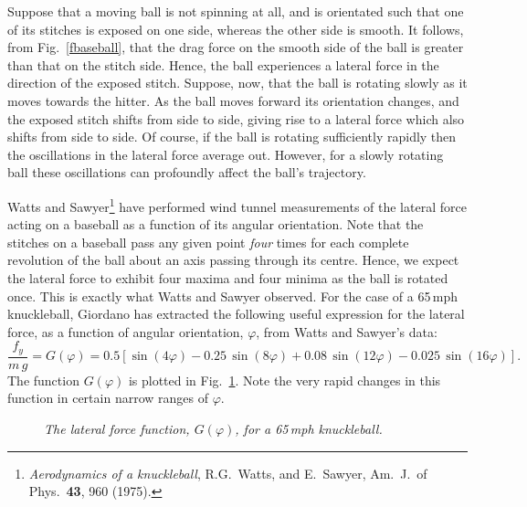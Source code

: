 Suppose that a moving ball is not spinning at all, and is orientated such that
one of its stitches is exposed on one side, whereas the other side is smooth.
It follows, from Fig.~\ref{fbaseball}, that the drag force on the smooth side
of the ball is greater than that on the stitch side. Hence, the ball experiences
a lateral force in the direction of the exposed stitch. Suppose, now,
that the ball is rotating slowly as it moves towards the hitter. As the ball
moves forward its orientation changes, and the exposed stitch  shifts from side to side, giving rise to
a lateral force which also shifts from side to side. Of course, if the ball
is rotating sufficiently rapidly then the oscillations in the lateral force 
average out. However, for a slowly rotating ball these oscillations can profoundly
affect the ball's trajectory. 

Watts and Sawyer\footnote{{\em Aerodynamics of a knuckleball}, R.G.~Watts, and
E.~Sawyer, Am.\ J.\ of Phys.\ {\bf 43}, 960 (1975).} have
performed wind tunnel measurements of
 the lateral force acting on a baseball as a function of its angular orientation.
Note that the stitches on a baseball pass any given point {\em four}\/ times for each
complete revolution of the ball about an axis passing  through its centre.
Hence, we expect the lateral force  to exhibit four maxima and four
minima as the ball is rotated once. This is exactly what Watts and Sawyer observed.
For the case of a 65\,mph knuckleball, Giordano has extracted the following
useful expression for the lateral force, as a function of  angular orientation, $\varphi$,
from Watts and Sawyer's data:
\begin{equation}
\frac{f_y}{m\,g} = G(\varphi) = 0.5\left[\sin(4\varphi) - 0.25\,\sin(8\varphi) + 0.08\,\sin(12\varphi)-
0.025\,\sin(16\varphi)\right].
\end{equation}
The function $G(\varphi)$ is plotted in Fig.~\ref{fglat}. Note the very rapid changes in this
function in certain narrow ranges of $\varphi$. 

\begin{figure}
\epsfysize=3.5in
\centerline{}
\caption{\em The lateral force function, $G(\varphi)$, for a
65\,mph knuckleball.}\label{fglat}
\end{figure}


